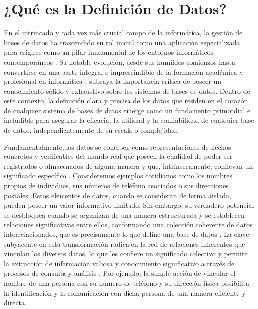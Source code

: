 \section{¿Qué es la Definición de Datos?}

En el intrincado y cada vez más crucial campo de la informática, la gestión de bases de datos ha trascendido su rol inicial como una aplicación especializada para erigirse como un pilar fundamental de los entornos informáticos contemporáneos \cite{Fundamentos-de-Sistemas-de-Bases-de-Datos}. Su notable evolución, desde sus humildes comienzos hasta convertirse en una parte integral e imprescindible de la formación académica y profesional en informática \cite{Fundamentos-de-Sistemas-de-Bases-de-Datos}, subraya la importancia crítica de poseer un conocimiento sólido y exhaustivo sobre los sistemas de bases de datos. Dentro de este contexto, la definición clara y precisa de los datos que residen en el corazón de cualquier sistema de bases de datos emerge como un fundamento primordial e ineludible para asegurar la eficacia, la utilidad y la confiabilidad de cualquier base de datos, independientemente de su escala o complejidad.

Fundamentalmente, los datos se conciben como representaciones de hechos concretos y verificables del mundo real que poseen la cualidad de poder ser registrados o almacenados de alguna manera y que, intrínsecamente, conllevan un significado específico \cite{Fundamentos-de-Sistemas-de-Bases-de-Datos, FBD_1}. Consideremos ejemplos cotidianos como los nombres propios de individuos, sus números de teléfono asociados o sus direcciones postales. Estos elementos de datos, cuando se consideran de forma aislada, pueden poseer un valor informativo limitado. Sin embargo, su verdadero potencial se desbloquea cuando se organizan de una manera estructurada y se establecen relaciones significativas entre ellos, conformando una colección coherente de datos interrelacionados, que es precisamente lo que define una base de datos \cite{Fundamentos-de-Sistemas-de-Bases-de-Datos, FBD_1}. La clave subyacente en esta transformación radica en la red de relaciones inherentes que vinculan los diversos datos, lo que les confiere un significado colectivo y permite la extracción de información valiosa y conocimiento significativo a través de procesos de consulta y análisis \cite{Fundamentos-de-Sistemas-de-Bases-de-Datos}. Por ejemplo, la simple acción de vincular el nombre de una persona con su número de teléfono y su dirección física posibilita la identificación y la comunicación con dicha persona de una manera eficiente y directa.

